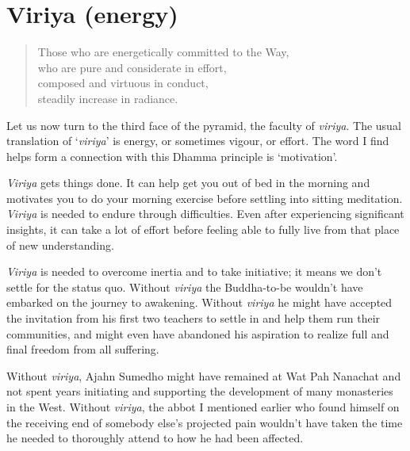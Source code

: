 \section{Viriya (energy)}

\begin{quote}
  Those who are energetically committed to the Way,\\
  who are pure and considerate in effort,\\
  composed and virtuous in conduct,\\
  steadily increase in radiance.

\end{quote}

Let us now turn to the third face of the pyramid, the faculty of
\emph{viriya}. The usual translation of `\emph{viriya}' is
energy, or sometimes vigour, or effort. The word I find helps form a
connection with this Dhamma principle is `motivation'.

\emph{Viriya} gets things done. It can help get you out of bed in the morning
and motivates you to do your morning exercise before settling into
sitting meditation. \emph{Viriya} is needed to endure through
difficulties. Even after experiencing significant insights, it can take
a lot of effort before feeling able to fully live from that place of new
understanding.

\emph{Viriya} is needed to overcome inertia and to take initiative; it
means we don't settle for the status quo. Without \emph{viriya} the
Buddha-to-be wouldn't have embarked on the journey to awakening. Without
\emph{viriya} he might have accepted the invitation from his first two
teachers to settle in and help them run their communities, and might
even have abandoned his aspiration to realize full and final freedom
from all suffering.

Without \emph{viriya}, Ajahn Sumedho might have remained at Wat Pah
Nanachat and not spent years initiating and supporting the development
of many monasteries in the West. Without \emph{viriya}, the abbot I
mentioned earlier who found himself on the receiving end of somebody
else's projected pain wouldn't have taken the time he needed to
thoroughly attend to how he had been affected.


